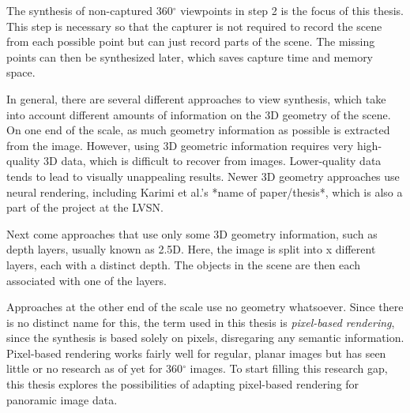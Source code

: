 The synthesis of non-captured 360$^{\circ}$ viewpoints in step 2 is the focus of this thesis. This step is necessary so that the capturer is not required to record the scene from each possible point but can just record parts of the scene. The missing points can then be synthesized later, which saves capture time and memory space.

In general, there are several different approaches to view synthesis, which take into account different amounts of information on the 3D geometry of the scene. On one end of the scale, as much geometry information as possible is extracted from the image. However, using 3D geometric information requires very high-quality 3D data, which is difficult to recover from images. Lower-quality data tends to lead to visually unappealing results.  Newer 3D geometry approaches use neural rendering, including Karimi et al.'s *name of paper/thesis*, which is also a part of the project at the LVSN.

Next come approaches that use only some 3D geometry information, such as depth layers, usually known as 2.5D. Here, the image is split into x different layers, each with a distinct depth. The objects in the scene are then each associated with one of the layers.

Approaches at the other end of the scale use no geometry whatsoever. Since there is no distinct name for this, the term used in this thesis is \emph{pixel-based rendering}, since the synthesis is based solely on pixels, disregaring any semantic information. 
Pixel-based rendering works fairly well for regular, planar images but has seen little or no research as of yet for 360$^{\circ}$ images. To start filling this research gap, this thesis explores the possibilities of adapting pixel-based rendering for panoramic image data. 


